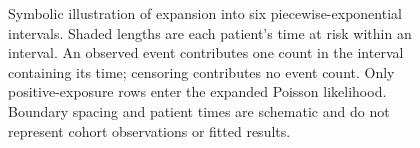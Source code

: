 \begin{figure}[htbp]
  \endgroup
  \caption[Patient exposure in the piecewise-exponential likelihood.]{Symbolic illustration of expansion into six piecewise-exponential
    intervals. Shaded lengths are each patient's time at risk within an
    interval. An observed event contributes one count in the interval containing
    its time; censoring contributes no event count. Only positive-exposure rows
    enter the expanded Poisson likelihood. Boundary spacing and patient times
    are schematic and do not represent cohort observations or fitted results.}
  \label{fig:interval-exposure}
\end{figure}
